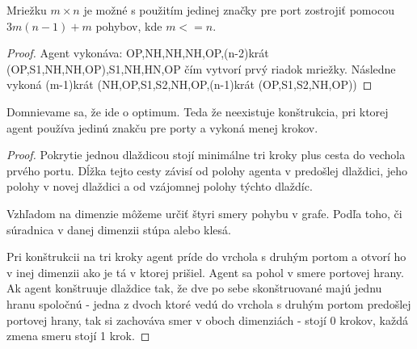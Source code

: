 \begin{veta}
Mriežku $m \times n$ je možné s použitím jedinej značky pre port zostrojiť
pomocou $3m(n - 1) + m$ pohybov, kde $m <= n$.
\end{veta}
\begin{proof}
Agent vykonáva: OP,NH,NH,NH,OP,(n-2)krát (OP,S1,NH,NH,OP),S1,NH,HN,OP čím
vytvorí prvý riadok mriežky. Následne vykoná
(m-1)krát (NH,OP,S1,S2,NH,OP,(n-1)krát (OP,S1,S2,NH,OP))
\end{proof}


Domnievame sa, že ide o optimum. Teda že neexistuje konštrukcia, pri ktorej
agent používa jedinú znakču pre porty a vykoná menej krokov.

\begin{proof}
\iffalse
Pokrytie jednou dlaždicou stojí minimálne tri kroky plus cesta do vechola
prvého portu. Dĺžka tejto cesty závisí od polohy agenta v predošlej
dlaždici, jeho polohy v novej dlaždici a od vzájomnej polohy týchto dlaždíc. 

Vzhľadom na dimenzie môžeme určiť štyri smery pohybu v grafe. Podľa toho, či
súradnica v danej dimenzii stúpa alebo klesá.

Pri konštrukcii na tri kroky agent príde do vrchola s druhým portom a otvorí
ho v inej dimenzii ako je tá v ktorej prišiel. Agent sa pohol v smere
portovej hrany.
Ak agent konštruuje dlaždice tak, že dve po sebe skonštruované majú jednu 
hranu spoločnú - jedna z dvoch ktoré vedú do vrchola s druhým portom
predošlej portovej hrany, tak si zachováva smer v oboch dimenziách - stojí 0
krokov, každá zmena smeru stojí 1 krok.


\end{proof}
